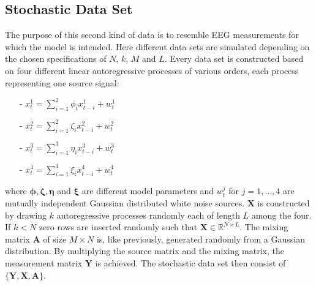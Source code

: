 \subsection{Stochastic Data Set}\label{sec:stoch_data}
The purpose of this second kind of data is to resemble EEG measurements for which the model is intended. 
Here different data sets are simulated depending on the chosen specifications of $N$, $k$, $M$ and $L$. 
Every data set is constructed based on four different linear autoregressive processes of various orders, each process representing one source signal:
\begin{itemize}
\item[-] $x_{t}^{1} = \sum_{i=1}^{2} \phi_i x_{t-i}^{1} + w_t^{1}$
\item[-] $x_{t}^{2} = \sum_{i=1}^{2} \zeta_i x_{t-i}^{2} + w_t^{2}$
\item[-] $x_{t}^{3} = \sum_{i=1}^{3} \eta_i x_{t-i}^{3} + w_t^{3}$
\item[-] $x_{t}^{4} = \sum_{i=1}^{4} \xi_i x_{t-i}^{4} + w_t^{4}$
\end{itemize}
where $\boldsymbol{\phi}, \boldsymbol{\zeta}, \boldsymbol{\eta}$ and $\boldsymbol{\xi}$ are different model parameters and $w_t^{j}$ for $j = 1,\dots ,4$ are mutually independent Gaussian distributed white noise sources.
$\mathbf{X}$ is constructed by drawing $k$ autoregressive processes randomly each of length $L$ among the four. If $k < N$ zero rows are inserted randomly such that $\mathbf{X} \in \mathbb{R}^{N \times L}$. 
The mixing matrix $\mathbf{A}$ of size $M \times N$ is, like previously, generated randomly from a Gaussian distribution.
By multiplying the source matrix and the mixing matrix, the measurement matrix $\mathbf{Y}$ is achieved.
The stochastic data set then consist of $\{ \mathbf{Y}, \mathbf{X}, \mathbf{A} \}$. 

